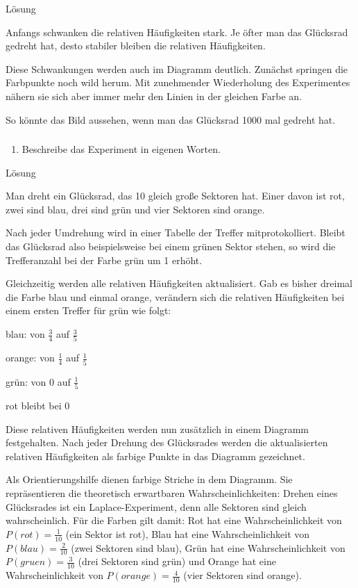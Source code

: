 \documentclass[
  ngerman,
]{book}
\providecommand{\tightlist}{%
  \setlength{\itemsep}{0pt}\setlength{\parskip}{0pt}}
\begin{document}
Lösung

Anfangs schwanken die relativen Häufigkeiten stark. Je öfter man das Glücksrad gedreht hat, desto stabiler bleiben die relativen Häufigkeiten.

Diese Schwankungen werden auch im Diagramm deutlich. Zunächst springen die Farbpunkte noch wild herum. Mit zunehmender Wiederholung des Experimentes nähern sie sich aber immer mehr den Linien in der gleichen Farbe an.

So könnte das Bild aussehen, wenn man das Glücksrad 1000 mal gedreht hat.

\hypertarget{section-78}{%
\subsubsection*{}\label{section-78}}

\begin{enumerate}
\def\labelenumi{\alph{enumi})}
\setcounter{enumi}{1}
\tightlist
\item
  Beschreibe das Experiment in eigenen Worten.
\end{enumerate}

Lösung

Man dreht ein Glücksrad, das 10 gleich große Sektoren hat. Einer davon ist rot, zwei sind blau, drei sind grün und vier Sektoren sind orange.

Nach jeder Umdrehung wird in einer Tabelle der Treffer mitprotokolliert. Bleibt das Glücksrad also beispielsweise bei einem grünen Sektor stehen, so wird die Trefferanzahl bei der Farbe grün um 1 erhöht.

Gleichzeitig werden alle relativen Häufigkeiten aktualisiert. Gab es bisher dreimal die Farbe blau und einmal orange, verändern sich die relativen Häufigkeiten bei einem ersten Treffer für grün wie folgt:

blau: von \(\frac{3}{4}\) auf \(\frac{3}{5}\)

orange: von \(\frac{1}{4}\) auf \(\frac{1}{5}\)

grün: von \(0\) auf \(\frac{1}{5}\)

rot bleibt bei \(0\)

Diese relativen Häufigkeiten werden nun zusätzlich in einem Diagramm festgehalten. Nach jeder Drehung des Glücksrades werden die aktualisierten relativen Häufigkeiten als farbige Punkte in das Diagramm gezeichnet.

Als Orientierungshilfe dienen farbige Striche in dem Diagramm. Sie repräsentieren die theoretisch erwartbaren Wahrscheinlichkeiten: Drehen eines Glücksrades ist ein Laplace-Experiment, denn alle Sektoren sind gleich wahrscheinlich. Für die Farben gilt damit: Rot hat eine Wahrscheinlichkeit von \(P(rot)=\frac{1}{10}\) (ein Sektor ist rot), Blau hat eine Wahrscheinlichkeit von \(P(blau)=\frac{2}{10}\) (zwei Sektoren sind blau), Grün hat eine Wahrscheinlichkeit von \(P(gruen)=\frac{3}{10}\) (drei Sektoren sind grün) und Orange hat eine Wahrscheinlichkeit von \(P(orange)=\frac{4}{10}\) (vier Sektoren sind orange).
\end{document}

